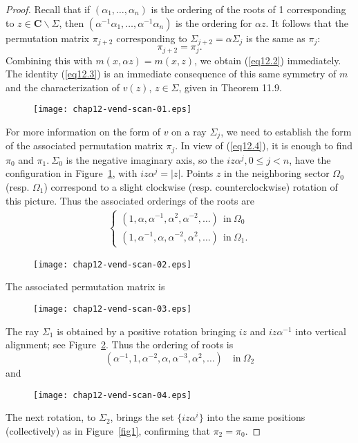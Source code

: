 \documentclass{surv-l}
\theoremstyle{plain}
\theoremstyle{definition}
\numberwithin{equation}{chapter}
\begin{document}
\begin{proof}
Recall that if $(\alpha_{1},\ldots,\alpha_{n})$ is the ordering of the roots of 1 corresponding to $ z\in \textbf{C}\backslash \Sigma$, then $(\alpha^{-1}\alpha_{1},\ldots, \alpha^{-1}\alpha_{n})$ is the ordering for $\alpha z$. It follows that the permutation matrix $\pi_{j+2}$ corresponding to $\Sigma_{j+2}=\alpha\Sigma_{j}$ is the same as $\pi_{j}$:
\begin{equation}\label{eq12.4}
\pi_{j+2}=\pi_{j}.
\end{equation}
Combining this with $m(x, \alpha z)=m(x, z)$, we obtain (\ref{eq12.2}) immediately. The identity (\ref{eq12.3}) is an immediate consequence of this same symmetry of $m$ and the characterization of $v(z)$, $ z\in\Sigma$, given in Theorem 11.9.

\begin{figure}
\texttt{[image: chap12-vend-scan-01.eps]}
\caption{}\label{chap12:fig2}
\end{figure}
For more information on the form of $v$ on a ray $\Sigma_{j}$, we need to establish the form of the associated permutation matrix $\pi_{j}$. In view of (\ref{eq12.4}), it is enough to
find $\pi_{0}$ and $\pi_{1}.\ \Sigma_{0}$ is the negative imaginary axis, so the $iz\alpha^{j}, 0\leq j<n$, have the configuration in Figure~\ref{chap12:fig2}, with $iz\alpha^{j}=|z|$. Points $z$ in the neighboring sector $\Omega_{0}$ (resp. $\Omega_{1}$) correspond to a slight clockwise (resp. counterclockwise) rotation of this picture. Thus the associated orderings of the roots are
\begin{align}\label{eq12.5}
\left\{\begin{array}{l}
(1, \alpha, \alpha^{-1}, \alpha^{2}, \alpha^{-2},\ldots)\ \ \mathrm{in}\ \Omega_{0}\\
(1, \alpha^{-1}, \alpha, \alpha^{-2}, \alpha^{2}, \ldots)\ \ \mathrm{in}\ \Omega_{1}.
\end{array}\right.
\end{align}
\begin{figure}
\texttt{[image: chap12-vend-scan-02.eps]}
\caption{}\label{fig3}
\end{figure}

The associated permutation matrix is
\begin{figure}[h]
\texttt{[image: chap12-vend-scan-03.eps]}
\end{figure}
The ray $\Sigma_{1}$ is obtained by a positive rotation bringing $iz$ and $iz\alpha^{-1}$ into vertical alignment; see Figure~\ref{fig3}. Thus the ordering of roots is
\setcounter{equation}{6}
\begin{equation}\label{eq12.7}
(\alpha^{-1}, 1,\alpha^{-2}, \alpha, \alpha^{-3}, \alpha^{2},\ldots)\quad \mathrm{in}\ \Omega_{2}
\end{equation}
and
\begin{figure}[h]
\texttt{[image: chap12-vend-scan-04.eps]}
\end{figure}
The next rotation, to $\Sigma_{2}$, brings the set $\{iz\alpha^{i}\}$ into the same positions (collectively) as in Figure~\ref{fig1}, confirming that $\pi_{2}=\pi_{0}$.


\end{proof}
\end{document}

